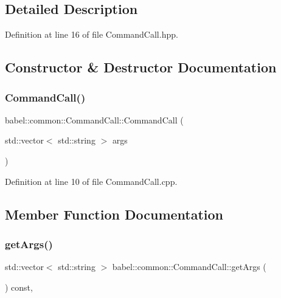 \subsection{Detailed Description}


Definition at line 16 of file Command\+Call.\+hpp.



\subsection{Constructor \& Destructor Documentation}
\mbox{\label{classbabel_1_1common_1_1_command_call_af6deb1688aa452584423a1af201ae9da}} 
\subsubsection{\texorpdfstring{Command\+Call()}{CommandCall()}}
{\footnotesize\ttfamily babel\+::common\+::\+Command\+Call\+::\+Command\+Call (\begin{DoxyParamCaption}\item[{std\+::vector$<$ std\+::string $>$}]{args }\end{DoxyParamCaption})}



Definition at line 10 of file Command\+Call.\+cpp.



\subsection{Member Function Documentation}
\mbox{\label{classbabel_1_1common_1_1_command_call_a008efa5d4ae4284c391f911b4708f99a}} 
\subsubsection{\texorpdfstring{get\+Args()}{getArgs()}}
{\footnotesize\ttfamily std\+::vector$<$ std\+::string $>$ babel\+::common\+::\+Command\+Call\+::get\+Args (\begin{DoxyParamCaption}{ }\end{DoxyParamCaption}) const\hspace{0.3cm}{\ttfamily [override]}, {\ttfamily [virtual]}}



